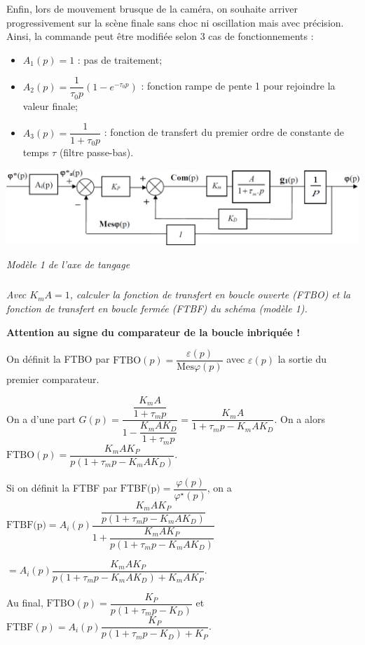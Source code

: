 \documentclass[10pt,fleqn]{article} %
\begin{document}
\begin{multicols}{2}
Enfin, lors de mouvement brusque de la caméra, on souhaite arriver progressivement sur la scène finale sans choc ni oscillation mais avec précision. Ainsi, la commande peut être modifiée selon 3 cas de fonctionnements : 
\begin{itemize}
\item $A_1(p)=1$ : pas de traitement;
\item $A_2(p)= \dfrac{1}{\tau_0 p} \left( 1-e^{-\tau_0 p}\right)$ : fonction rampe de pente 1 pour rejoindre la valeur finale;
\item $A_3(p)= \dfrac{1}{1+\tau_0 p}$ : fonction de transfert du  premier ordre de constante de temps $\tau$ (filtre passe-bas).
\end{itemize}
\begin{center}
\includegraphics[width=\linewidth]{images/fig_01}

\textit{Modèle 1 de l’axe de tangage}
\end{center}

\subparagraph{}
\textit{Avec $K_m A = 1$, calculer la fonction de transfert en boucle ouverte (FTBO) et la fonction de transfert
en boucle fermée (FTBF) du schéma (modèle 1).}
\ifprof
\begin{corrige}
\textbf{Attention au signe du comparateur de la boucle inbriquée !}

On définit la FTBO par $\text{FTBO}(p)=\dfrac{\varepsilon(p)}{\text{Mes}\varphi(p)}$ avec $\varepsilon(p)$ la sortie du premier comparateur.

On a d'une part $G(p)=\dfrac{\dfrac{K_m A}{1+\tau_m p}}{1-\dfrac{K_m A K_D }{1+\tau_m p}}= \dfrac{K_m A}{1+\tau_m p-K_m A K_D }$.
On a alors $\text{FTBO}(p)=\dfrac{K_m A K_P}{p\left(1+\tau_m p-K_m A K_D \right)}$. 

Si on définit la FTBF par $\text{FTBF(p)}=\dfrac{\varphi(p)}{\varphi^{\star}(p)}$, on a 
$\text{FTBF(p)}=A_i(p)\dfrac{\dfrac{K_m A K_P}{p\left(1+\tau_m p-K_m A K_D \right)}}{1+\dfrac{K_m A K_P}{p\left(1+\tau_m p-K_m A K_D \right)}}$ 

$=A_i(p)\dfrac{K_m A K_P}{p\left(1+\tau_m p-K_m A K_D \right)+K_m A K_P}$.

Au final, 
$\text{FTBO}(p)=\dfrac{ K_P}{p\left(1+\tau_m p-K_D \right)}$ et 
$\text{FTBF}(p)=A_i(p)\dfrac{K_P}{p\left(1+\tau_m p- K_D \right)+K_P}$.
\end{corrige}
\else
\fi


\end{multicols}
\end{document}
